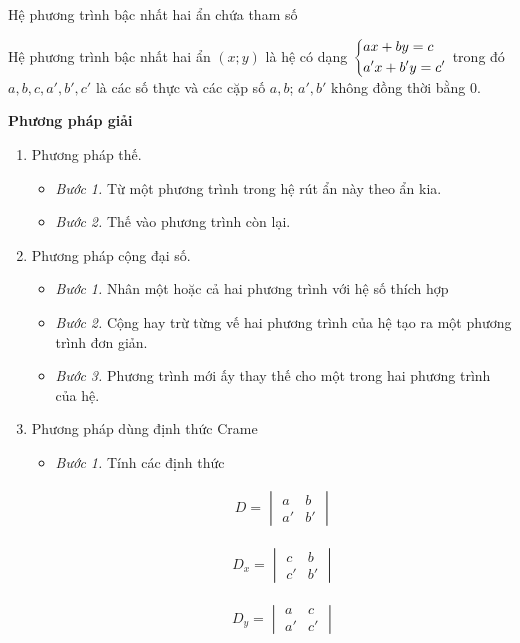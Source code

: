 
\begin{dang}{Hệ phương trình bậc nhất hai ẩn chứa tham số}
\begin{dn}
Hệ phương trình bậc nhất hai ẩn $(x;y)$ là hệ có dạng $\left\{\begin{aligned}& ax+by=c\\ & a'x +b'y=c'\end{aligned}\right.$ trong đó $a,b,c,a',b',c'$ là các số thực và các cặp số $a,b$; $a',b'$ không đồng thời bằng 0.
\end{dn}
 {\bf Phương pháp giải}

\begin{enumerate}[1)]
\item Phương pháp thế.
	\begin{itemize}
	\item {\it Bước 1.} Từ một phương trình trong hệ rút ẩn này theo ẩn kia.
	\item {\it Bước 2.} Thế vào phương trình còn lại.
	\end{itemize}
\item Phương pháp cộng đại số.
	\begin{itemize}
	\item {\it Bước 1.} Nhân một hoặc cả hai phương trình với hệ số thích hợp
	\item {\it Bước 2.} Cộng hay trừ từng vế hai phương trình của hệ tạo ra một phương trình đơn giản.
	\item {\it Bước 3.} Phương trình  mới ấy thay thế cho một trong hai phương trình của hệ.
	\end{itemize}
\item Phương  pháp dùng định thức Crame
 	\begin{itemize}
 	\item {\it Bước 1.} Tính các định thức\\
 	\begin{minipage}{4cm}
 	\begin{align*}
  D=  \begin{vmatrix}
        a & b \\
        a' & b'
    \end{vmatrix}
\end{align*}
 	\end{minipage}
 \begin{minipage}{4cm}
 \begin{align*}
  D_x=  \begin{vmatrix}
        c & b \\
        c' & b'
    \end{vmatrix}
\end{align*} 
\end{minipage}
\begin{minipage}{4cm}
\begin{align*}
  D_y=  \begin{vmatrix}
        a & c \\
        a' & c'
    \end{vmatrix}
\end{align*}
\end{minipage}


\end{itemize}
\end{enumerate}
\end{dang}
